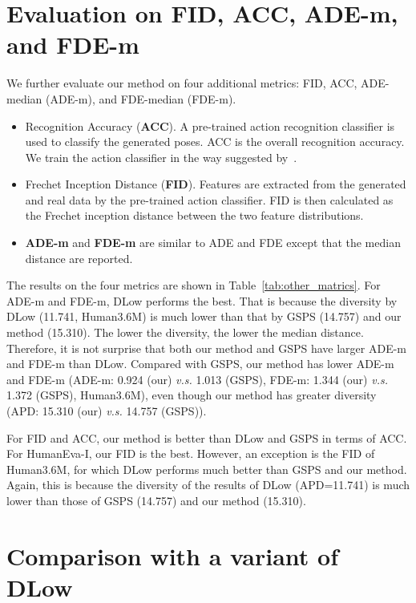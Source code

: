 \documentclass[sigconf,screen,nonacm]{acmart}
\begin{document}
	
	\section{Evaluation on FID, ACC, ADE-m, and FDE-m}
	
	We further evaluate our method on four additional metrics: FID, ACC, ADE-median (ADE-m), and FDE-median (FDE-m).
	
	\begin{itemize}
		\item Recognition Accuracy (\textbf{ACC}). A pre-trained action recognition classifier is used to classify the generated poses. ACC is the overall recognition accuracy. We train the action classifier in the way suggested by~\cite{bie2022hit}.
		\item Frechet Inception Distance (\textbf{FID}). Features are extracted from the generated and real data by the pre-trained action classifier. FID is then calculated as the Frechet inception distance between the two feature distributions.
		\item \textbf{ADE-m} and \textbf{FDE-m} are similar to ADE and FDE except that the median distance are reported.
	\end{itemize}
	
	




	The results on the four metrics are shown in Table~\ref{tab:other_matrics}.
	For ADE-m and FDE-m, DLow performs the best. That is because the diversity by DLow (11.741, Human3.6M) is much lower than that by GSPS (14.757) and our method (15.310). The lower the diversity, the lower the median distance. Therefore, it is not surprise that both our method and GSPS have larger ADE-m and FDE-m than DLow. Compared with GSPS, our method has lower ADE-m and FDE-m (ADE-m: 0.924 (our) \textit{v.s.} 1.013 (GSPS), FDE-m: 1.344 (our) \textit{v.s.} 1.372 (GSPS), Human3.6M), even though our method has greater diversity (APD: 15.310 (our) \textit{v.s.} 14.757 (GSPS)).
	
	For FID and ACC, our method is better than DLow and GSPS in terms of ACC. For HumanEva-I, our FID is the best. However, an exception is the FID of Human3.6M, for which DLow performs much better than GSPS and our method. Again, this is because the diversity of the results of DLow (APD=11.741) is much lower than those of GSPS (14.757) and our method (15.310).
	


	\section{Comparison with a variant of DLow}
	
\end{document}
